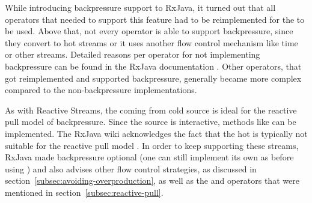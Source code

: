 While introducing backpressure support to RxJava, it turned out that all operators that needed to support this feature had to be reimplemented for the  to be used. Above that, not every operator is able to support backpressure, since they convert to hot streams or it uses another flow control mechanism like time or other streams. Detailed reasons per operator for not implementing backpressure can be found in the RxJava documentation \cite{rx-api}. Other operators, that got reimplemented and supported backpressure, generally became more complex compared to the non-backpressure implementations.

As with Reactive Streams, the \obs coming from cold source is ideal for the reactive pull model of backpressure. Since the source is interactive, methods like  can be implemented. The RxJava wiki acknowledges the fact that the hot \obs is typically not suitable for the reactive pull model \cite{RxJava-Wiki-HotCold}. In order to keep supporting these streams, RxJava made backpressure optional (one can still implement its own \obs as before using ) and also advises other flow control strategies, as discussed in section~\ref{subsec:avoiding-overproduction}, as well as the  and  operators that were mentioned in section~\ref{subsec:reactive-pull}.



































